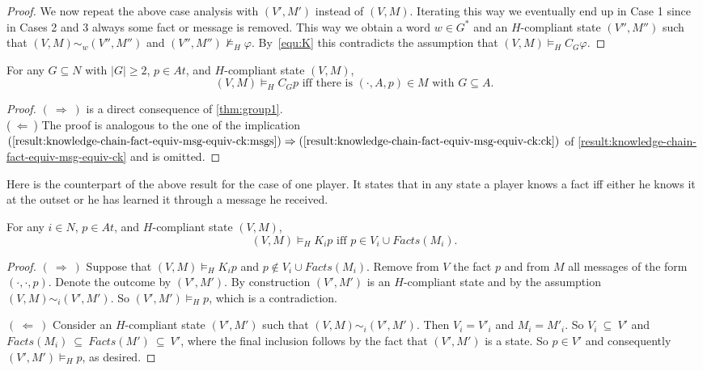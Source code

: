 \documentclass{article}
\newcounter{#1}
\newcommand{\La}{\mbox{$\:\Leftarrow\:$}}
\newcommand{\Ra}{\mbox{$\:\Rightarrow\:$}}
\newcommand{\sse}{\mbox{$\:\subseteq\:$}}
\newcommand{\NI}{\noindent}
\newcommand{\II}{\vspace{2 mm}}
\newcommand{\state}[1][]{\ensuremath{(V#1,M#1)}\xspace}
\newcommand{\msg}[3]{\ensuremath{(#1,#2,#3)}\xspace}
\newcommand{\bits}{\ensuremath{At}\xspace}
\newcommand{\knows}[1]{\ensuremath{K_{#1}}\xspace}
\newcommand{\ck}[1]{\ensuremath{C_{#1}}\xspace}\newcommand{\Facts}{\mathit{Facts}}
\begin{document}
\begin{proof}
We now repeat the above case analysis with $(V',M')$ instead of $(V,M)$.
Iterating this way we eventually end up in Case 1 since in Cases 2 and 3
always some fact or message is removed.  This way we obtain a word $w \in
G^*$ and an $H$-compliant state $(V'', M'')$ such that $(V,M) \sim_{w} (V'', M'')$
and $(V'', M'') \nvDash_H \varphi$.  By~\eqref{equ:K} this contradicts the assumption that
$\state\vDash_H \ck G \varphi$.  
\end{proof}

\begin{corollary} \label{cor:iff}
For any $G \subseteq N$ with $|G| \geq 2$, $p\in\bits$, and $H$-compliant state $\state$,
\[
\mbox{$\state\vDash_H \ck G p$ iff there is $\msg{\cdot}{A}{p}\in M$ with $G \subseteq A$.}
\]
\end{corollary}
\begin{proof}
$(\Ra)$ is a direct consequence of \cref{thm:group1}.\\
\NI ($\La$) 
The proof is analogous to the one of the implication
$(\ref{result:knowledge-chain-fact-equiv-msg-equiv-ck:msgs})\Rightarrow
  (\ref{result:knowledge-chain-fact-equiv-msg-equiv-ck:ck})$ of
\cref{result:knowledge-chain-fact-equiv-msg-equiv-ck} and is omitted.
\end{proof}

Here is the counterpart of the above result for the case of one
player.  It states that in any state a player knows a fact iff either
he knows it at the outset or he has learned it through a message he
received.


\begin{lemma}
  \label{lem:equiv_i}
For any $i\in N$, $p\in\bits$, and $H$-compliant state $\state$,
\[
\mbox{$\state\vDash_H \knows i p$ iff $p \in V_i \cup\Facts(M_i)$.}
\]
\end{lemma}
\begin{proof}
$(\Ra)$ 
Suppose that $\state\vDash_H \knows i p$ and $p \not\in V_i \cup\Facts(M_i)$.
Remove from $V$ the fact $p$ and from $M$ all messages of the form $(\cdot, \cdot, p)$.
Denote the outcome by $(V',M')$. By construction $(V',M')$ is an $H$-compliant state and by the assumption
$(V,M) \sim_i (V',M')$. So $(V',M') \vDash_H p$, which is a contradiction.
\II

\NI
$(\La)$ 
Consider an  $H$-compliant state $\state[']$ such that $\state \sim_i \state[']$.
Then $V_i = V'_i$ and $M_i = M'_i$. So $V_i \sse V'$ and 
$\Facts(M_i) \sse \Facts(M') \sse V'$, where the final inclusion follows by 
the fact that $\state[']$ is a state. So $p \in V'$ and consequently $\state['] \vDash_H p$, as desired.
\end{proof}
\end{document}
